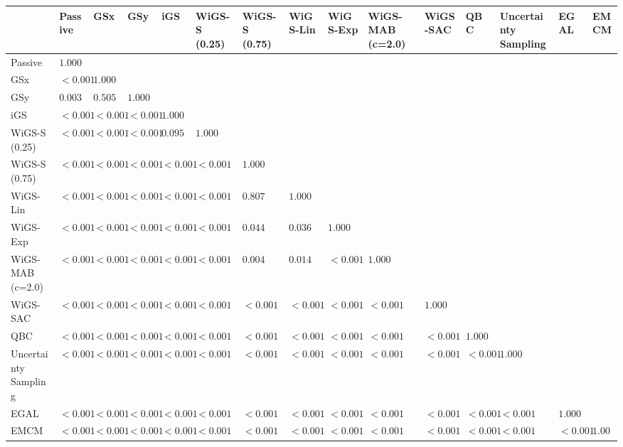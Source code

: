 \begin{tabular}{lllllllllllllll}
\toprule
 & Passive & GSx & GSy & iGS & WiGS-S (0.25) & WiGS-S (0.75) & WiGS-Lin & WiGS-Exp & WiGS-MAB (c=2.0) & WiGS-SAC & QBC & Uncertainty Sampling & EGAL & EMCM \\
\midrule
Passive & $1.000$ &  &  &  &  &  &  &  &  &  &  &  &  &  \\
GSx & $<0.001$ & $1.000$ &  &  &  &  &  &  &  &  &  &  &  &  \\
GSy & $0.003$ & $0.505$ & $1.000$ &  &  &  &  &  &  &  &  &  &  &  \\
iGS & $<0.001$ & $<0.001$ & $<0.001$ & $1.000$ &  &  &  &  &  &  &  &  &  &  \\
WiGS-S (0.25) & $<0.001$ & $<0.001$ & $<0.001$ & $0.095$ & $1.000$ &  &  &  &  &  &  &  &  &  \\
WiGS-S (0.75) & $<0.001$ & $<0.001$ & $<0.001$ & $<0.001$ & $<0.001$ & $1.000$ &  &  &  &  &  &  &  &  \\
WiGS-Lin & $<0.001$ & $<0.001$ & $<0.001$ & $<0.001$ & $<0.001$ & $0.807$ & $1.000$ &  &  &  &  &  &  &  \\
WiGS-Exp & $<0.001$ & $<0.001$ & $<0.001$ & $<0.001$ & $<0.001$ & $0.044$ & $0.036$ & $1.000$ &  &  &  &  &  &  \\
WiGS-MAB (c=2.0) & $<0.001$ & $<0.001$ & $<0.001$ & $<0.001$ & $<0.001$ & $0.004$ & $0.014$ & $<0.001$ & $1.000$ &  &  &  &  &  \\
WiGS-SAC & $<0.001$ & $<0.001$ & $<0.001$ & $<0.001$ & $<0.001$ & $<0.001$ & $<0.001$ & $<0.001$ & $<0.001$ & $1.000$ &  &  &  &  \\
QBC & $<0.001$ & $<0.001$ & $<0.001$ & $<0.001$ & $<0.001$ & $<0.001$ & $<0.001$ & $<0.001$ & $<0.001$ & $<0.001$ & $1.000$ &  &  &  \\
Uncertainty Sampling & $<0.001$ & $<0.001$ & $<0.001$ & $<0.001$ & $<0.001$ & $<0.001$ & $<0.001$ & $<0.001$ & $<0.001$ & $<0.001$ & $<0.001$ & $1.000$ &  &  \\
EGAL & $<0.001$ & $<0.001$ & $<0.001$ & $<0.001$ & $<0.001$ & $<0.001$ & $<0.001$ & $<0.001$ & $<0.001$ & $<0.001$ & $<0.001$ & $<0.001$ & $1.000$ &  \\
EMCM & $<0.001$ & $<0.001$ & $<0.001$ & $<0.001$ & $<0.001$ & $<0.001$ & $<0.001$ & $<0.001$ & $<0.001$ & $<0.001$ & $<0.001$ & $<0.001$ & $<0.001$ & $1.000$ \\
\bottomrule
\end{tabular}
